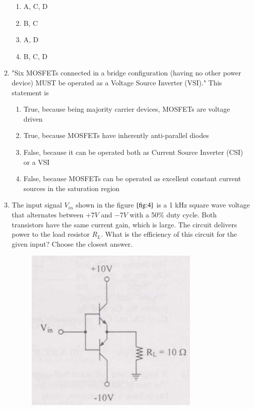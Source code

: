\documentclass[journal]{IEEEtran}
\numberwithin{equation}{enumi}
\numberwithin{figure}{enumi}
\begin{document}
\begin{enumerate}
\begin{multicols}{4}
\begin{enumerate}
    \item A, C, D
    \item B, C
    \item A, D
    \item B, C, D
\end{enumerate}
\end{multicols}
\item "Six MOSFETs connected in a bridge configuration (having no other power device) MUST be operated as a Voltage Source Inverter (VSI)." This statement is
\begin{enumerate}
    \item True, because being majority carrier devices, MOSFETs are voltage driven
    \item True, because MOSFETs have inherently anti-parallel diodes
    \item False, because it can be operated both as Current Source Inverter (CSI) or a VSI
    \item False, because MOSFETs can be operated as excellent constant current sources in the saturation region
\end{enumerate}
\bigskip
\item The input signal $V_{in}$ shown in the figure $\ref{fig:4}$ is a 1 kHz square wave voltage that alternates between $+7V$ and $-7V$ with a 50\% duty cycle. Both transistors have the same current gain, which is large. The circuit delivers power to the load resistor $R_L$. What is the efficiency of this circuit for the given input? Choose the closest answer.
\begin{figure}[!ht]
    \centering
    \includegraphics[width=\linewidth]{figs/4.png}

\end{figure}
\end{enumerate}
\end{document}
